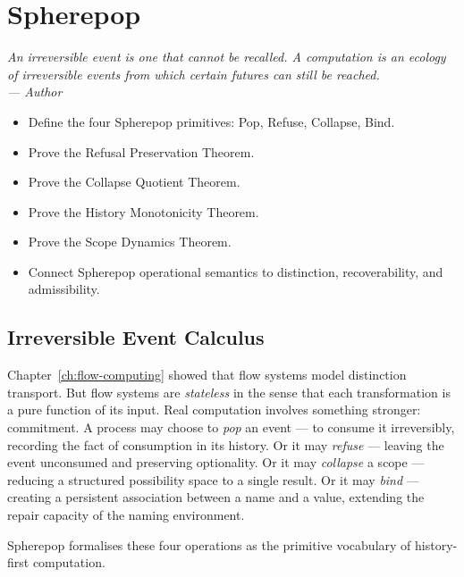 \documentclass[12pt,twoside,openright]{book}
\newenvironment{epigraph}[2]{%
  \vspace{1em}\begin{flushright}
  \begin{minipage}{0.72\textwidth}
  \itshape\small #1\\[0.4em]
  \upshape\footnotesize\sffamily\color{DistGray}--- #2
  \end{minipage}\end{flushright}\vspace{1.5em}}{}
\newenvironment{objectives}{%
  \begin{tcolorbox}[colback=DistBlue!5,colframe=DistBlue,
    title={\faCheckCircle\enspace Learning Objectives},
    fonttitle=\sffamily\bfseries\color{white},
    attach boxed title to top left={yshift=-2mm,xshift=4mm},
    boxed title style={colback=DistBlue},breakable]
  \begin{itemize}[leftmargin=*,nosep]}{%
  \end{itemize}\end{tcolorbox}\vspace{1em}}
\begin{document}
\chapter{Spherepop}
\label{ch:spherepop}

\begin{epigraph}{%
  An irreversible event is one that cannot be recalled.
  A computation is an ecology of irreversible events
  from which certain futures can still be reached.}%
  {Author}
\end{epigraph}

\begin{objectives}
  \item Define the four Spherepop primitives:
        Pop, Refuse, Collapse, Bind.
  \item Prove the Refusal Preservation Theorem.
  \item Prove the Collapse Quotient Theorem.
  \item Prove the History Monotonicity Theorem.
  \item Prove the Scope Dynamics Theorem.
  \item Connect Spherepop operational semantics to
        distinction, recoverability, and admissibility.
\end{objectives}

\section{Irreversible Event Calculus}

Chapter~\ref{ch:flow-computing} showed that flow systems
model distinction transport. But flow systems are
\emph{stateless} in the sense that each transformation is
a pure function of its input. Real computation involves
something stronger: commitment. A process may choose to
\emph{pop} an event — to consume it irreversibly,
recording the fact of consumption in its history. Or it
may \emph{refuse} — leaving the event unconsumed and
preserving optionality. Or it may \emph{collapse} a scope
— reducing a structured possibility space to a single
result. Or it may \emph{bind} — creating a persistent
association between a name and a value, extending the
repair capacity of the naming environment.

Spherepop formalises these four operations as the
primitive vocabulary of history-first computation.
\end{document}
